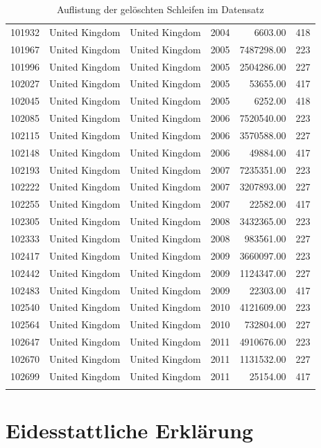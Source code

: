 \documentclass[a4paper,ngerman,oneside,titlepage,bibliography=totoc,11pt]{scrreprt}
\begin{document}
{\begin{longtable}{rllrrr}
  101932 & United Kingdom & United Kingdom & 2004 & 6603.00 & 418 \\ 
  101967 & United Kingdom & United Kingdom & 2005 & 7487298.00 & 223 \\ 
  101996 & United Kingdom & United Kingdom & 2005 & 2504286.00 & 227 \\ 
  102027 & United Kingdom & United Kingdom & 2005 & 53655.00 & 417 \\ 
  102045 & United Kingdom & United Kingdom & 2005 & 6252.00 & 418 \\ 
  102085 & United Kingdom & United Kingdom & 2006 & 7520540.00 & 223 \\ 
  102115 & United Kingdom & United Kingdom & 2006 & 3570588.00 & 227 \\ 
  102148 & United Kingdom & United Kingdom & 2006 & 49884.00 & 417 \\ 
  102193 & United Kingdom & United Kingdom & 2007 & 7235351.00 & 223 \\ 
  102222 & United Kingdom & United Kingdom & 2007 & 3207893.00 & 227 \\ 
  102255 & United Kingdom & United Kingdom & 2007 & 22582.00 & 417 \\ 
  102305 & United Kingdom & United Kingdom & 2008 & 3432365.00 & 223 \\ 
  102333 & United Kingdom & United Kingdom & 2008 & 983561.00 & 227 \\ 
  102417 & United Kingdom & United Kingdom & 2009 & 3660097.00 & 223 \\ 
  102442 & United Kingdom & United Kingdom & 2009 & 1124347.00 & 227 \\ 
  102483 & United Kingdom & United Kingdom & 2009 & 22303.00 & 417 \\ 
  102540 & United Kingdom & United Kingdom & 2010 & 4121609.00 & 223 \\ 
  102564 & United Kingdom & United Kingdom & 2010 & 732804.00 & 227 \\ 
  102647 & United Kingdom & United Kingdom & 2011 & 4910676.00 & 223 \\ 
  102670 & United Kingdom & United Kingdom & 2011 & 1131532.00 & 227 \\ 
  102699 & United Kingdom & United Kingdom & 2011 & 25154.00 & 417 \\ 
   \hline
	\caption{Auflistung der gelöschten Schleifen im Datensatz}
\end{longtable}

 }


\chapter*{Eidesstattliche Erklärung}
\end{document}
